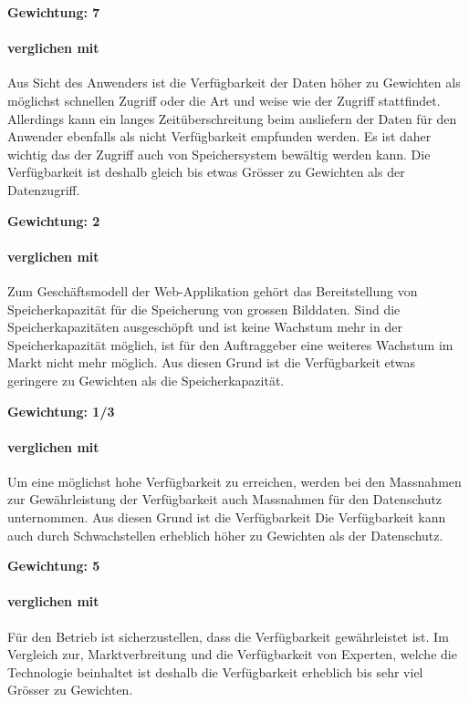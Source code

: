 \textbf{Gewichtung: 7}

\paragraph*{ verglichen mit }
Aus Sicht des Anwenders ist die Verfügbarkeit der Daten höher zu Gewichten als möglichst schnellen Zugriff oder die Art und weise wie der Zugriff stattfindet. Allerdings kann ein langes Zeitüberschreitung beim ausliefern der Daten für den Anwender ebenfalls als nicht Verfügbarkeit empfunden werden.  Es ist daher wichtig das der Zugriff auch von Speichersystem bewältig werden kann. Die Verfügbarkeit ist deshalb gleich bis etwas Grösser zu Gewichten als der Datenzugriff.

\textbf{Gewichtung: 2}

\paragraph*{ verglichen mit }
Zum Geschäftsmodell der Web-Applikation gehört das Bereitstellung von Speicherkapazität für die Speicherung von grossen Bilddaten. Sind die Speicherkapazitäten ausgeschöpft und ist keine Wachstum mehr in der Speicherkapazität möglich, ist für den Auftraggeber eine weiteres Wachstum im Markt nicht mehr möglich. Aus diesen Grund ist die Verfügbarkeit etwas geringere zu Gewichten als die Speicherkapazität.

\textbf{Gewichtung: 1/3}

\paragraph*{ verglichen mit }
Um eine möglichst hohe Verfügbarkeit zu erreichen, werden bei den Massnahmen zur Gewährleistung der Verfügbarkeit auch Massnahmen für den Datenschutz unternommen. Aus diesen Grund ist die Verfügbarkeit 
Die Verfügbarkeit kann auch durch Schwachstellen erheblich höher zu Gewichten als der Datenschutz.

\textbf{Gewichtung: 5}

\paragraph*{ verglichen mit }
Für den Betrieb ist sicherzustellen, dass die Verfügbarkeit gewährleistet ist. Im Vergleich zur, Marktverbreitung und die Verfügbarkeit von Experten, welche die Technologie beinhaltet ist deshalb die Verfügbarkeit erheblich bis sehr viel 
Grösser zu Gewichten.

